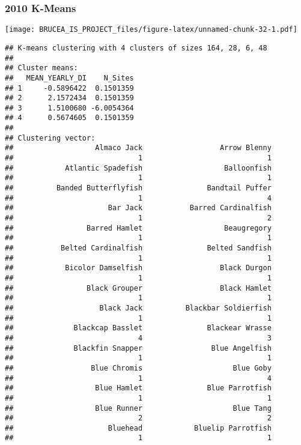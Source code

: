 \documentclass[
]{article}
\begin{document}
\hypertarget{k-means-6}{%
\subsubsection{2010 K-Means}\label{k-means-6}}

\texttt{[image: BRUCEA\_IS\_PROJECT\_files/figure-latex/unnamed-chunk-32-1.pdf]}

\begin{verbatim}
## K-means clustering with 4 clusters of sizes 164, 28, 6, 48
## 
## Cluster means:
##   MEAN_YEARLY_DI    N_Sites
## 1     -0.5896422  0.1501359
## 2      2.1572434  0.1501359
## 3      1.5100680 -6.0054364
## 4      0.5674605  0.1501359
## 
## Clustering vector:
##                   Almaco Jack                  Arrow Blenny 
##                             1                             1 
##            Atlantic Spadefish                   Balloonfish 
##                             1                             1 
##          Banded Butterflyfish               Bandtail Puffer 
##                             1                             4 
##                      Bar Jack           Barred Cardinalfish 
##                             1                             2 
##                 Barred Hamlet                   Beaugregory 
##                             1                             1 
##           Belted Cardinalfish               Belted Sandfish 
##                             1                             1 
##            Bicolor Damselfish                  Black Durgon 
##                             1                             1 
##                 Black Grouper                  Black Hamlet 
##                             1                             1 
##                    Black Jack          Blackbar Soldierfish 
##                             1                             1 
##              Blackcap Basslet               Blackear Wrasse 
##                             4                             3 
##              Blackfin Snapper                Blue Angelfish 
##                             1                             1 
##                  Blue Chromis                     Blue Goby 
##                             1                             4 
##                   Blue Hamlet               Blue Parrotfish 
##                             1                             1 
##                   Blue Runner                     Blue Tang 
##                             2                             2 
##                      Bluehead            Bluelip Parrotfish 
##                             1                             1 

\end{verbatim}
\end{document}
